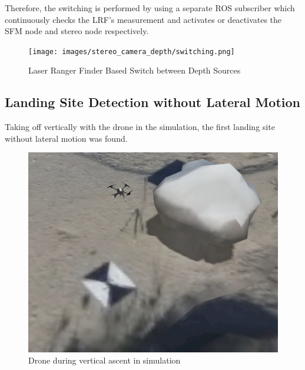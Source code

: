 Therefore, the switching is performed by using a separate ROS subscriber which continuously checks the LRF's measurement and activates or deactivates the SFM node and stereo node respectively.

\begin{figure}[h]
    \centering
    \texttt{[image: images/stereo\_camera\_depth/switching.png]}
    \caption{Laser Ranger Finder Based Switch between Depth Sources}
\end{figure}




\subsection{Landing Site Detection without Lateral Motion}

Taking off vertically with the drone in the simulation, the first landing site without lateral motion was found.

\begin{figure}
    \centering
    \includegraphics[scale=0.34]{images/stereo_camera_depth/ascent_sim.png}
    \caption{Drone during vertical ascent in simulation}
\end{figure}


